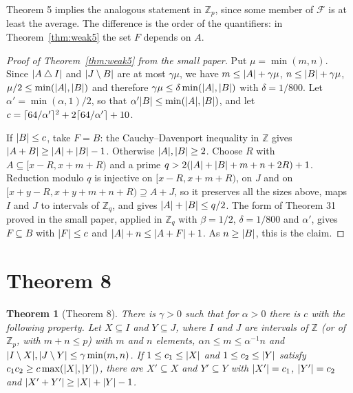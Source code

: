 \documentclass[11pt]{amsart}
\newtheorem*{theorem*}{Theorem}
\theoremstyle{remark}
\newcommand{\Z}{\mathbb{Z}}
\DeclarePairedDelimiter{\abs}{\lvert}{\rvert}
\DeclarePairedDelimiter{\ceil}{\lceil}{\rceil}
\begin{document}
Theorem 5 implies the analogous statement in $\Z_p$, since some member of $\mathcal F$ is at least
the average. The difference is the order of the quantifiers: in Theorem~\ref{thm:weak5} the set
$F$ depends on $A$.

\begin{proof}[Proof of Theorem~\ref{thm:weak5} from the small paper]
Put $\mu = \min(m, n)$. Since $\abs{A \mathbin{\triangle} I}$ and $\abs{J \setminus B}$ are at most
$\gamma \mu$, we have $m \le \abs{A} + \gamma\mu$, $n \le \abs{B} + \gamma\mu$,
$\mu / 2 \le \min(\abs{A}, \abs{B})$ and therefore
$\gamma \mu \le \delta \min(\abs{A}, \abs{B})$ with $\delta = 1/800$. Let
$\alpha' = \min(\alpha, 1)/2$, so that $\alpha' \abs{B} \le \min(\abs{A}, \abs{B})$, and let
$c = \ceil{64/\alpha'}^2 + 2\ceil{64/\alpha'} + 10$.

If $\abs{B} \le c$, take $F = B$: the Cauchy--Davenport inequality in $\Z$ gives
$\abs{A + B} \ge \abs{A} + \abs{B} - 1$. Otherwise $\abs{A}, \abs{B} \ge 2$. Choose $R$ with
$A \subseteq [x - R, x + m + R)$ and a prime $q > 2(\abs{A} + \abs{B} + m + n + 2R) + 1$.
Reduction modulo $q$ is injective on $[x - R, x + m + R)$, on $J$ and on
$[x + y - R, x + y + m + n + R) \supseteq A + J$, so it preserves all the sizes above, maps $I$
and $J$ to intervals of $\Z_q$, and gives $\abs{A} + \abs{B} \le q/2$. The form of Theorem 31
proved in the small paper, applied in $\Z_q$ with $\beta = 1/2$, $\delta = 1/800$ and $\alpha'$,
gives $F \subseteq B$ with $\abs{F} \le c$ and $\abs{A} + n \le \abs{A + F} + 1$. As
$n \ge \abs{B}$, this is the claim.
\end{proof}

\section{Theorem 8}

\begin{theorem*}[Theorem 8]
There is $\gamma > 0$ such that for $\alpha > 0$ there is $c$ with the following property. Let
$X \subseteq I$ and $Y \subseteq J$, where $I$ and $J$ are intervals of $\Z$ (or of $\Z_p$, with
$m + n \le p$) with $m$ and $n$ elements, $\alpha n \le m \le \alpha^{-1} n$ and
$\abs{I \setminus X}, \abs{J \setminus Y} \le \gamma \min(m, n)$. If
$1 \le c_1 \le \abs{X}$ and $1 \le c_2 \le \abs{Y}$ satisfy
$c_1 c_2 \ge c \max(\abs{X}, \abs{Y})$, there are $X' \subseteq X$ and $Y' \subseteq Y$ with
$\abs{X'} = c_1$, $\abs{Y'} = c_2$ and $\abs{X' + Y'} \ge \abs{X} + \abs{Y} - 1$.
\end{theorem*}
\end{document}
